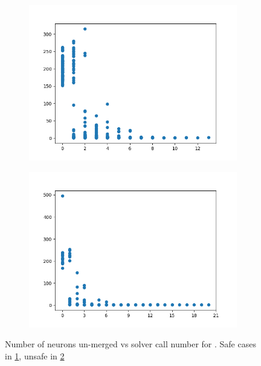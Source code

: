 \begin{figure}
    \begin{subfigure}{0.475\linewidth}
        \centering
        \includegraphics[scale=0.25]{figs/acas_verif_ref_sizes_safe.png}
        \caption{}
        \label{f:acas-verif-ref-safe}
    \end{subfigure}
    \begin{subfigure}{0.475\linewidth}
        \centering
        \includegraphics[scale=0.25]{figs/acas_verif_ref_sizes_unsafe.png}
        \caption{}
        \label{f:acas-verif-ref-unsafe}
    \end{subfigure}
    \caption{Number of neurons un-merged vs solver call number for \acasxu. Safe
        cases in \ref{f:acas-verif-ref-safe}, unsafe in
        \ref{f:acas-verif-ref-unsafe}}
    \label{f:acas-verif-ref}
\end{figure}

